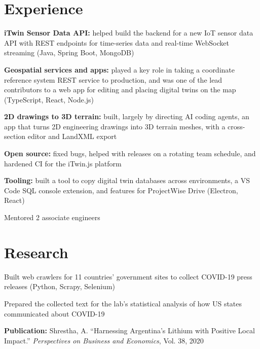 \documentclass[]{deedy-resume-openfont}
\begin{document}
\begin{minipage}[t]{0.67\textwidth}

\section{Experience}
\vspace{\topsep}
\begin{tightemize}
\item {\bf iTwin Sensor Data API:} helped build the backend for a new IoT sensor data API with REST endpoints for time-series data and real-time WebSocket streaming (Java, Spring Boot, MongoDB)
\item {\bf Geospatial services and apps:} played a key role in taking a coordinate reference system REST service to production, and was one of the lead contributors to a web app for editing and placing digital twins on the map (TypeScript, React, Node.js)
\item {\bf 2D drawings to 3D terrain:} built, largely by directing AI coding agents, an app that turns 2D engineering drawings into 3D terrain meshes, with a cross-section editor and LandXML export
\item {\bf Open source:} fixed bugs, helped with releases on a rotating team schedule, and hardened CI for the iTwin.js platform
\item {\bf Tooling:} built a tool to copy digital twin databases across environments, a VS Code SQL console extension, and features for ProjectWise Drive (Electron, React)
\item Mentored 2 associate engineers
\end{tightemize}
\sectionsep

\section{Research}
\begin{tightemize}
\item Built web crawlers for 11 countries' government sites to collect COVID-19 press releases (Python, Scrapy, Selenium)
\item Prepared the collected text for the lab's statistical analysis of how US states communicated about COVID-19
\end{tightemize}
\vspace{4pt}
{\bf Publication:} Shrestha, A. ``Harnessing Argentina's Lithium with Positive Local Impact.'' \textit{Perspectives on Business and Economics}, Vol. 38, 2020
\sectionsep


\end{minipage}
\end{document}
